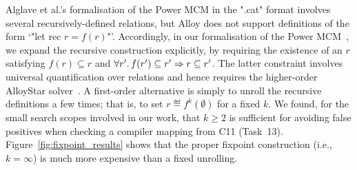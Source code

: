 Alglave et al.'s formalisation of the Power MCM in the ".cat" format
involves several recursively-defined relations, but Alloy does not
support definitions of the form `"let rec $r = f(r)$"'. Accordingly,
in our formalisation of the Power MCM~\cite{popl17supplementary}, we
expand the recursive construction explicitly, by requiring the
existence of an $r$ satisfying $f(r) \subseteq r$ and
$\forall r'\ldotp f(r')\subseteq r' \Rightarrow r \subseteq r'$. The
latter constraint involves universal quantification over relations and
hence requires the higher-order AlloyStar solver~\cite{milicevic+15}.
A first-order alternative is simply to unroll the recursive
definitions a few times; that is, to set $r \eqdef f^k(\emptyset)$ for a
fixed $k$. We found, for the small search scopes involved in our work,
that $k\ge 2$ is sufficient for avoiding false positives when checking
a compiler mapping from C11 (Task~13).
Figure~\ref{fig:fixpoint_results} shows that the proper fixpoint
construction (i.e., $k=\infty$) is much more expensive than a
fixed unrolling.


